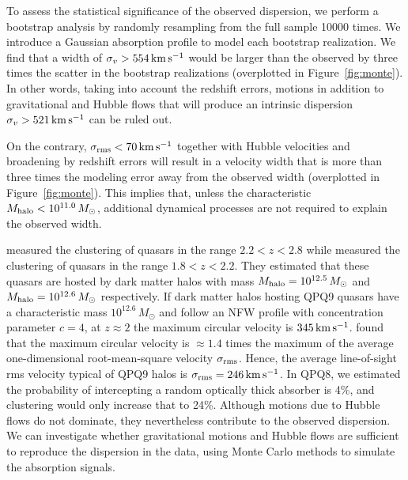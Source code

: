 \documentclass[iop]{emulateapj}
\begin{document}
To assess the statistical significance of the observed dispersion, we perform a bootstrap
analysis by randomly resampling from the full sample 10000 times. We introduce a Gaussian absorption
profile to model each bootstrap realization. We find that a width of
$\sigma_v>554\,{\rm km\,s^{-1}}$ would be larger than the observed by three times the scatter in
the bootstrap realizations
(overplotted in Figure~\ref{fig:monte}). In other words, taking into account the redshift errors,
motions in addition to gravitational and Hubble flows that will produce an intrinsic dispersion
$\sigma_v>521\,{\rm km\,s^{-1}}$ can be ruled out.

On the contrary,
$\sigma_{\rm rms}<70\,{\rm km\,s^{-1}}$ together with Hubble velocities and
broadening by redshift errors will result in a velocity width that is more than three times the
modeling error away from the observed width (overplotted in Figure~\ref{fig:monte}). This implies
that, unless the characteristic $M_{\rm halo}<10^{11.0}\,M_\odot$,
additional dynamical processes are not required to explain the observed width.

\cite{Eftekharzadeh+15} measured the clustering of quasars in the range $2.2<z<2.8$ while
\cite{RodriguezTorres+17} measured the clustering of quasars in the range $1.8<z<2.2$. They
estimated that these quasars are hosted by dark matter halos with mass
$M_{\rm halo}=10^{12.5}\,M_\odot$ and $M_{\rm halo}=10^{12.6}\,M_\odot$ respectively. If dark
matter halos hosting QPQ9 quasars have a characteristic mass $10^{12.6}\,M_\odot$ and follow an
NFW profile \citep{NavarroFrenkWhite97} with concentration parameter $c=4$, at $z\approx2$ the
maximum circular velocity is $345\,{\rm km\,s^{-1}}$. \cite{TormenBouchetWhite97} found that the
maximum circular velocity is $\approx1.4$ times the maximum of the average one-dimensional
root-mean-square velocity $\sigma_{\rm rms}$. Hence, the average line-of-sight rms velocity
typical of QPQ9 halos is $\sigma_{\rm rms}=246\,{\rm km\,s^{-1}}$. In QPQ8, we estimated the
probability of intercepting a random optically thick absorber is 4\%, and clustering would only
increase that to 24\%. Although motions due to Hubble flows do not dominate, they nevertheless
contribute to the observed dispersion. We can investigate
whether gravitational motions and Hubble flows are sufficient to reproduce the dispersion in the
data, using Monte Carlo methods to simulate the absorption signals.
\end{document}
